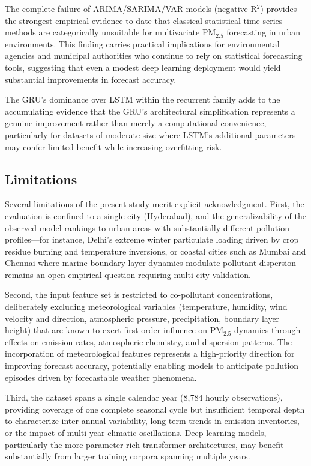 \documentclass[conference]{IEEEtran}
\begin{document}
The complete failure of ARIMA/SARIMA/VAR models (negative R$^{2}$) provides the strongest empirical evidence to date that classical statistical time series methods are categorically unsuitable for multivariate PM$_{2.5}$ forecasting in urban environments. This finding carries practical implications for environmental agencies and municipal authorities who continue to rely on statistical forecasting tools, suggesting that even a modest deep learning deployment would yield substantial improvements in forecast accuracy.

The GRU's dominance over LSTM within the recurrent family adds to the accumulating evidence \cite{cho2014, chung2014} that the GRU's architectural simplification represents a genuine improvement rather than merely a computational convenience, particularly for datasets of moderate size where LSTM's additional parameters may confer limited benefit while increasing overfitting risk.

\subsection{Limitations}

Several limitations of the present study merit explicit acknowledgment. First, the evaluation is confined to a single city (Hyderabad), and the generalizability of the observed model rankings to urban areas with substantially different pollution profiles---for instance, Delhi's extreme winter particulate loading driven by crop residue burning and temperature inversions, or coastal cities such as Mumbai and Chennai where marine boundary layer dynamics modulate pollutant dispersion---remains an open empirical question requiring multi-city validation.

Second, the input feature set is restricted to co-pollutant concentrations, deliberately excluding meteorological variables (temperature, humidity, wind velocity and direction, atmospheric pressure, precipitation, boundary layer height) that are known to exert first-order influence on PM$_{2.5}$ dynamics through effects on emission rates, atmospheric chemistry, and dispersion patterns. The incorporation of meteorological features represents a high-priority direction for improving forecast accuracy, potentially enabling models to anticipate pollution episodes driven by forecastable weather phenomena.

Third, the dataset spans a single calendar year (8,784 hourly observations), providing coverage of one complete seasonal cycle but insufficient temporal depth to characterize inter-annual variability, long-term trends in emission inventories, or the impact of multi-year climatic oscillations. Deep learning models, particularly the more parameter-rich transformer architectures, may benefit substantially from larger training corpora spanning multiple years.
\end{document}
